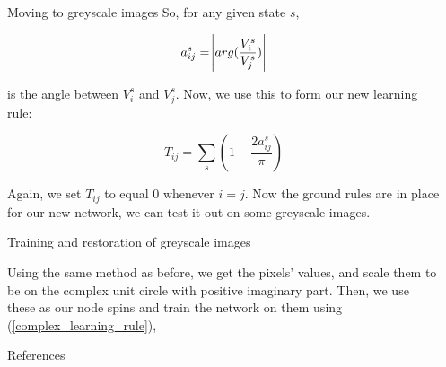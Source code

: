 \documentclass[25pt, a0paper, portrait]{beamer}
\newlength{\sepwidth}
\newlength{\colwidth}
\newcommand{\separatorcolumn}{\begin{column}{\sepwidth}\end{column}}
\begin{document}
\begin{frame}[t]
\begin{columns}[t]
\begin{column}{\colwidth}
\begin{block}{Moving to greyscale images}
    So, for any given state $s$,

    \begin{equation*}
      a^s_{ij} = \abs{arg(\frac{V^s_i}{V^s_j})}
    \end{equation*}

    is the angle between $V^s_i$ and $V^s_j$. Now, we use this to form our new learning rule:
    
    \begin{equation} \label{complex_learning_rule}
      T_{ij} = \sum_{s}(1 - \frac{2a^s_{ij}}{\pi})
    \end{equation}

    Again, we set $T_{ij}$ to equal $0$ whenever $i = j$. Now the ground rules are in place
    for our new network, we can test it out on some greyscale images.

  \end{block}

  \begin{block}{Training and restoration of greyscale images} \small

    Using the same method as before, we get the pixels' values, and scale them to be on the
    complex unit circle with positive imaginary part. Then, we use these as our node spins and
    train the network on them using (\ref{complex_learning_rule}), 

  \end{block}

  \begin{block}{References}
    \footnotesize{}

  \end{block}

\end{column}

\separatorcolumn
\end{columns}
\end{frame}
\end{document}
